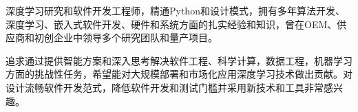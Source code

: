 \documentclass[../resume_xin.tex]{subfiles}
\begin{document}


\begin{cvparagraph}

深度学习研究和软件开发工程师，精通Python和设计模式，拥有多年算法开发、深度学习、嵌入式软件开发、硬件和系统方面的扎实经验和知识，曾在OEM、供应商和初创企业中领导多个研究团队和量产项目。

追求通过提供智能方案和深入思考解决软件工程、科学计算，数据工程，机器学习方面的挑战性任务，希望能对大规模部署和市场化应用深度学习技术做出贡献。对设计流畅软件开发范式，降低软件开发和测试门槛并采用新技术和工具非常感兴趣。

\end{cvparagraph}
\end{document}
